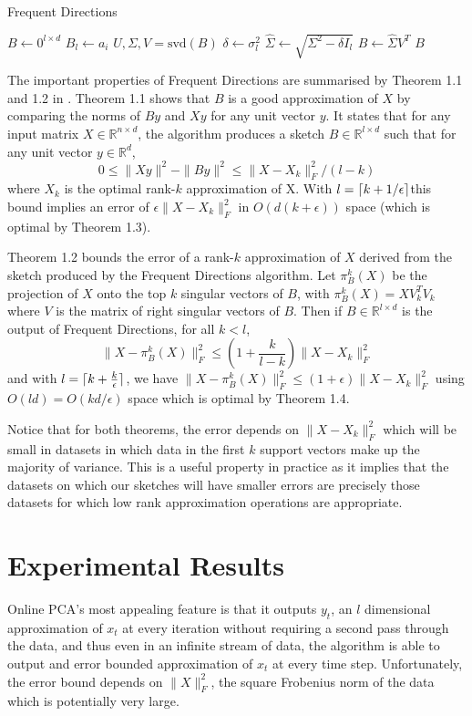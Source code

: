 \documentclass[11pt, oneside]{amsart}
\DeclarePairedDelimiter{\ceil}{\lceil}{\rceil}
\begin{document}
\begin{algorithm}
\caption{Frequent Directions}
\label{freq}
\begin{algorithmic}[1]
\State $B \leftarrow 0^{l \times d}$
\State $B_l \leftarrow a_i$
\State $U, \Sigma, V = \text{svd}(B)$
\State $\delta \leftarrow \sigma_l^2$
\State $\hat{\Sigma}\leftarrow\sqrt{\Sigma^2 - \delta I_l}$
\State $B \leftarrow \hat{\Sigma} V^T$
\EndFor
\State \Return $B$
\EndFunction
\end{algorithmic}
\end{algorithm}

The important properties of Frequent Directions are summarised by Theorem 1.1 and 1.2 in \cite{FreqDirections}. Theorem 1.1 shows that $B$ is a good approximation of $X$ by comparing the norms of $By$ and $Xy$ for any unit vector $y$. It states that for any input matrix $X \in \mathbb{R}^{n\times d}$, the algorithm produces a sketch $B\in \mathbb{R}^{l\times d}$ such that for any unit vector $y\in \mathbb{R}^d$,
\[
0 \leq \|Xy\|^2 - \|By\|^2 \leq \|X - X_k\|_F^2/(l - k)\]
where $X_k$ is the optimal rank-$k$ approximation of X. With $l = \ceil{k + 1/\epsilon}$this bound implies an error of $\epsilon \|X - X_k\|_F^2$ in $O(d(k+\epsilon))$ space (which is optimal by Theorem 1.3).

Theorem 1.2 bounds the error of a rank-$k$ approximation of $X$ derived from the sketch produced by the Frequent Directions algorithm. Let $\pi^k_B(X) $ be the projection of $X$ onto the top $k$ singular vectors of $B$, with $\pi^k_B(X) = XV_k^TV_k$ where $V$ is the matrix of right singular vectors of $B$. Then if $B \in \mathbb{R}^{l\times d}$ is the output of Frequent Directions, for all $k < l$,
\[
 \|X - \pi^k_B(X)\|_F^2 \leq (1 + \frac{k}{l-k}) \|X - X_k\|_F^2
\]
and with $l = \ceil{k + \frac{k}{\epsilon}}$,  we have $ \|X - \pi^k_B(X)\|_F^2 \leq (1+\epsilon) \|X - X_k\|_F^2$ using $O(l d) = O(kd/\epsilon)$ space which is optimal by Theorem 1.4.

Notice that for both theorems, the error depends on $\|X - X_k\|_F^2$ which will be small in datasets in which data in the first $k$ support vectors make up the majority of variance. This is a useful property in practice as it implies that the datasets on which our sketches will have smaller errors are precisely those datasets for which low rank approximation operations are appropriate.

\section{Experimental Results}
Online PCA's most appealing feature is that it outputs $y_t$, an $l$ dimensional approximation of $x_t$ at every iteration without requiring a second pass through the data, and thus even in an infinite stream of data, the algorithm is able to output and error bounded approximation of $x_t$ at every time step. Unfortunately, the error bound depends on $\|X\|^2_F$, the square Frobenius norm of the data which is potentially very large.
\end{document}
